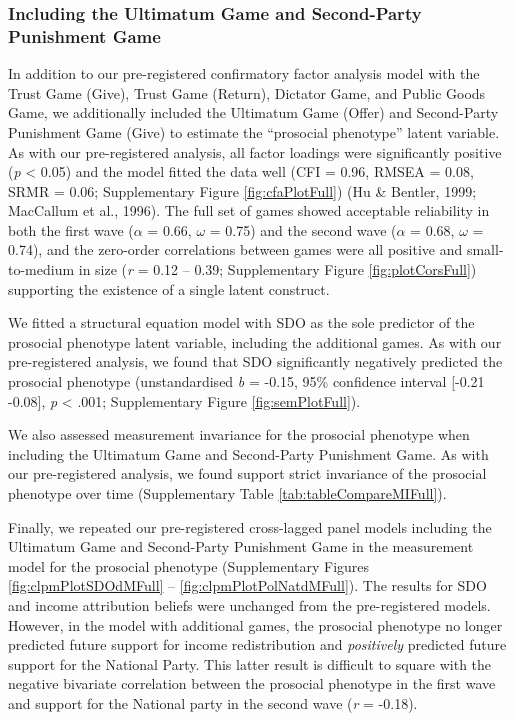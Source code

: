 \documentclass[
  man,floatsintext]{apa6}
\begin{document}
\hypertarget{including-the-ultimatum-game-and-second-party-punishment-game}{%
\subsubsection{Including the Ultimatum Game and Second-Party Punishment Game}\label{including-the-ultimatum-game-and-second-party-punishment-game}}

In addition to our pre-registered confirmatory factor analysis model with the
Trust Game (Give), Trust Game (Return), Dictator Game, and Public Goods Game,
we additionally included the Ultimatum Game (Offer) and Second-Party Punishment
Game (Give) to estimate the ``prosocial phenotype'' latent variable. As with our
pre-registered analysis, all factor loadings were significantly
positive (\emph{p} \textless{} 0.05) and the model fitted the data well (CFI =
0.96, RMSEA =
0.08, SRMR =
0.06; Supplementary Figure
\ref{fig:cfaPlotFull}) (Hu \& Bentler, 1999; MacCallum et al., 1996). The full set of games showed
acceptable reliability in both the first wave (\(\alpha\) =
0.66, \(\omega\) =
0.75) and the second wave
(\(\alpha\) = 0.68, \(\omega\) =
0.74), and the zero-order
correlations between games were all positive and small-to-medium in size
(\emph{r} = 0.12 -- 0.39; Supplementary Figure \ref{fig:plotCorsFull}) supporting
the existence of a single latent construct.

We fitted a structural equation model with SDO as the sole predictor of
the prosocial phenotype latent variable, including the additional games. As with
our pre-registered analysis, we found that SDO significantly negatively
predicted the prosocial phenotype (unstandardised \emph{b} = -0.15,
95\% confidence interval {[}-0.21 -0.08{]}, \emph{p}
\textless{} .001; Supplementary Figure \ref{fig:semPlotFull}).

We also assessed measurement invariance for the prosocial phenotype when
including the Ultimatum Game and Second-Party Punishment Game. As with our
pre-registered analysis, we found support strict invariance of the prosocial
phenotype over time (Supplementary Table \ref{tab:tableCompareMIFull}).

Finally, we repeated our pre-registered cross-lagged panel models including
the Ultimatum Game and Second-Party Punishment Game in the measurement model
for the prosocial phenotype (Supplementary Figures \ref{fig:clpmPlotSDOdMFull}
-- \ref{fig:clpmPlotPolNatdMFull}). The results for SDO and income attribution
beliefs were unchanged from the pre-registered models. However, in the model
with additional games, the prosocial phenotype no longer predicted future
support for income redistribution and \emph{positively} predicted future support for
the National Party. This latter result is difficult to square with the negative
bivariate correlation between the prosocial phenotype in the first wave and
support for the National party in the second wave (\emph{r} =
-0.18).
\end{document}
